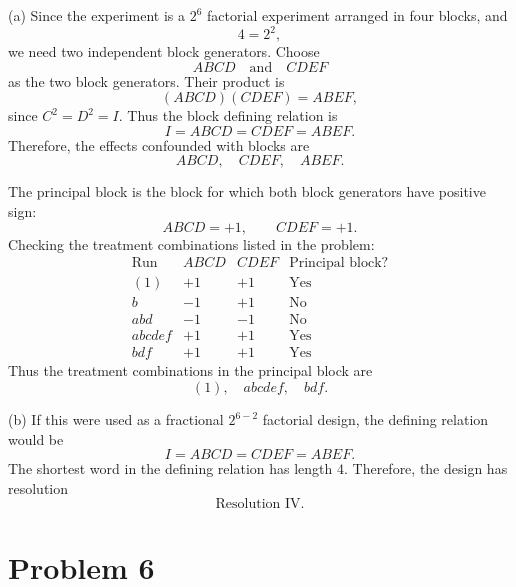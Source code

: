 \documentclass[answers,12pt,addpoints]{exam}
\begin{document}
\begin{solution}
(a) Since the experiment is a $2^6$ factorial experiment arranged in four blocks, and
\[
4=2^2,
\]
we need two independent block generators. Choose
\[
ABCD \quad \text{and} \quad CDEF
\]
as the two block generators. Their product is
\[
(ABCD)(CDEF)=ABEF,
\]
since $C^2=D^2=I$. Thus the block defining relation is
\[
I=ABCD=CDEF=ABEF.
\]
Therefore, the effects confounded with blocks are
\[
ABCD,\quad CDEF,\quad ABEF.
\]

The principal block is the block for which both block generators have positive sign:
\[
ABCD=+1,\qquad CDEF=+1.
\]
Checking the treatment combinations listed in the problem:
\[
\begin{array}{c|c|c|c}
\text{Run} & ABCD & CDEF & \text{Principal block?} \\
\hline
(1) & +1 & +1 & \text{Yes} \\
b & -1 & +1 & \text{No} \\
abd & -1 & -1 & \text{No} \\
abcdef & +1 & +1 & \text{Yes} \\
bdf & +1 & +1 & \text{Yes}
\end{array}
\]
Thus the treatment combinations in the principal block are
\[
(1),\quad abcdef,\quad bdf.
\]

(b) If this were used as a fractional $2^{6-2}$ factorial design, the defining relation would be
\[
I=ABCD=CDEF=ABEF.
\]
The shortest word in the defining relation has length $4$. Therefore, the design has resolution
\[
\boxed{\text{Resolution IV}}.
\]
\end{solution}

\section{Problem 6}
\end{document}
